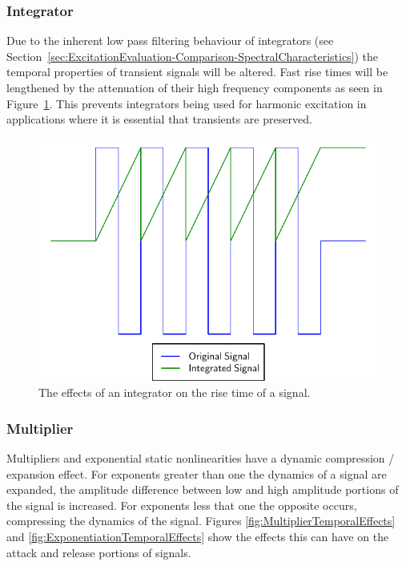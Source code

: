 		\subsubsection*{Integrator}
			Due to the inherent low pass filtering behaviour of integrators (see
			Section~\ref{sec:ExcitationEvaluation-Comparison-SpectralCharacteristics}) the temporal properties
			of transient signals will be altered. Fast rise times will be lengthened by the attenuation of
			their high frequency components as seen in Figure~\ref{fig:IntegratorTemporalEffects}. This
			prevents integrators being used for harmonic excitation in applications where it is essential that
			transients are preserved. 

			\begin{figure}[h!]
				\centering
				\includegraphics{chapter5/Images/IntegratorTemporalEffects.pdf}
				\caption{The effects of an integrator on the rise time of a signal.}
				\label{fig:IntegratorTemporalEffects}
			\end{figure}
			
		\subsubsection*{Multiplier}
			Multipliers and exponential static nonlinearities have a dynamic compression / expansion effect.
			For exponents greater than one the dynamics of a signal are expanded, the amplitude difference
			between low and high amplitude portions of the signal is increased. For exponents less that one the
			opposite occurs, compressing the dynamics of the signal. Figures
			\ref{fig:MultiplierTemporalEffects} and \ref{fig:ExponentiationTemporalEffects} show the effects
			this can have on the attack and release portions of signals.

